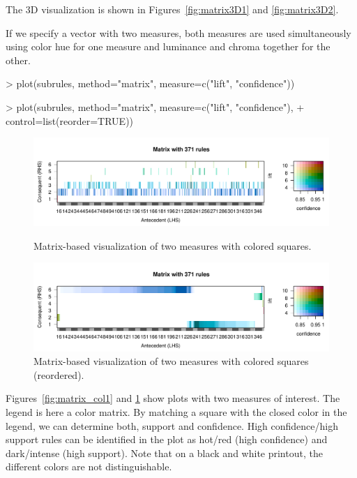 \documentclass[nojss]{jss}
\begin{document}
The 3D visualization is shown in Figures~\ref{fig:matrix3D1} and
\ref{fig:matrix3D2}.

If we specify a vector with two measures, both measures
are used simultaneously using color hue for one measure and luminance
and chroma together for the other.

\begin{Schunk}
\begin{Sinput}
> plot(subrules, method="matrix", measure=c("lift", "confidence"))
\end{Sinput}
\end{Schunk}
\begin{Schunk}
\begin{Sinput}
> plot(subrules, method="matrix", measure=c("lift", "confidence"),
+         control=list(reorder=TRUE))
\end{Sinput}
\end{Schunk}

\begin{figure}
\centering
\includegraphics[width=\linewidth]{arulesViz-matrix_col1}
\caption{Matrix-based visualization of two measures with colored squares.
\label{fig:matrix_col1}}

\includegraphics[width=\linewidth]{arulesViz-matrix_col2}
\caption{Matrix-based visualization of two measures with colored squares (reordered).
\label{fig:matrix_col2}}
\end{figure}

Figures~\ref{fig:matrix_col1} and \ref{fig:matrix_col2} show plots with two
measures of interest. The legend is here a color matrix.  By matching a square
with the closed color in the legend, we can determine both, support and
confidence.  High confidence/high support rules can be identified in the plot
as hot/red (high confidence) and dark/intense (high support).  Note that on a
black and white printout, the different colors are not distinguishable.
\end{document}
